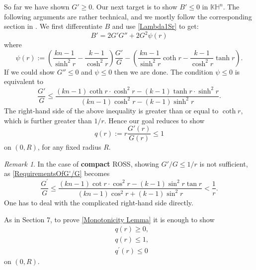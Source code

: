 \documentclass{amsart}
\numberwithin{equation}{section}
\theoremstyle{plain}
\theoremstyle{definition}
\theoremstyle{remark}
\newtheorem{remark}{Remark}[section]
\def\KK {\mathbb{K}}
\def\HH {\mathbb{H}}
\begin{document}
So far we have shown $G'\geq0$. Our next target is to show $B'\leq0$ in $\KK\HH^n$. The following arguments are rather technical, and we mostly follow the corresponding section in \cite{benguria2007second}. We first differentiate $B$ and use \cref{Lambda1Sr} to get:
\begin{equation}\label{Bprime}
    B'=2G'G''+ 2G^2\psi(r)
\end{equation}
where \begin{equation}\label{SecondTermBprime}
    \psi(r):=\left(\frac{k n-1}{\sinh^2{r}}-\frac{k-1}{\cosh^2 r}\right) \frac{G'}{G}-\left(\frac{k n-1}{\sinh^2 r} \coth{r}-\frac{k-1}{\cosh^2 r} \tanh{r} \right).
\end{equation}
If we could show $G''\leq0$ and $\psi\leq0$ then we are done. The condition $\psi\leq 0$ is equivalent to 
\begin{equation}\label{RequirementsOfG'/G}
    \frac{G'}{G} \leqslant \frac{(k n-1) \operatorname{coth}r \cdot \cosh^2 r-(k-1) \tanh r \cdot \sinh^2 r}{(k n-1) \cosh ^2 r-(k-1) \sinh^2 r}.
\end{equation}
The right-hand side of the above inequality is greater than or equal to $\coth r$, which is further greater than $1/r$. Hence our goal reduces to show 
\begin{equation}\label{DefinitionOfQ}
    q(r):= r\frac{G'(r)}{G(r)}\leq 1
\end{equation}
on $(0,R)$, for any fixed radius $R$. 
\begin{remark}\label{remark:CompactRossQ}
    In the case of \textbf{compact} ROSS, showing $G'/G\leq 1/r$ is not sufficient, as \cref{RequirementsOfG'/G} becomes 
    \begin{equation}
        \frac{G^{\prime}}{G} \leq \frac{(k n-1) \cot{r} \cdot \cos^2{r}-(k-1) \sin^2 {r} \tan r}{(k n-1) \cos^2{r}+(k-1) \sin^2 {r}}< \frac{1}{r}.
    \end{equation}
    One has to deal with the complicated right-hand side directly.
\end{remark}
\par As in \cite{benguria2007second} Section 7, to prove \cref{Monotonicity Lemma} it is enough to show 
\begin{equation}\label{RequirementsForQ}
\begin{aligned}
& q(r) \geq 0, \\
& q(r) \leq 1,\\
& q^{\prime}(r) \leq 0
\end{aligned}
\end{equation}
on $(0,R)$.
\end{document}
